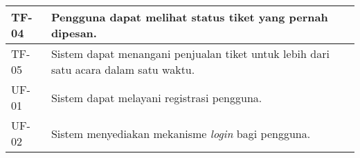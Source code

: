 \begin{longtable}{|l|p{}|p{}|}
    \hline
    \hline
    TF-04       & Pengguna dapat melihat status tiket yang pernah dipesan.                                                                                                                                                                        &                                                                                                                                                                                                                                                                                                                                                       \\
    \hline
    TF-05       & Sistem dapat menangani penjualan tiket untuk lebih dari satu acara dalam satu waktu.                                                                                                                                            &                                                                                                                                                                                                                                                                                                                                                       \\
    \hline
    \hline
    UF-01       & Sistem dapat melayani registrasi pengguna.                                                                                                                                                                                      &                                                                                                                                                                                                                                                                                                                                                       \\
    \hline
    \hline
    UF-02       & Sistem menyediakan mekanisme \textit{login} bagi pengguna.                                                                                                                                                                      &                                                                                                                                                                                                                                                                                                                                                       \\
    \hline

\end{longtable}
